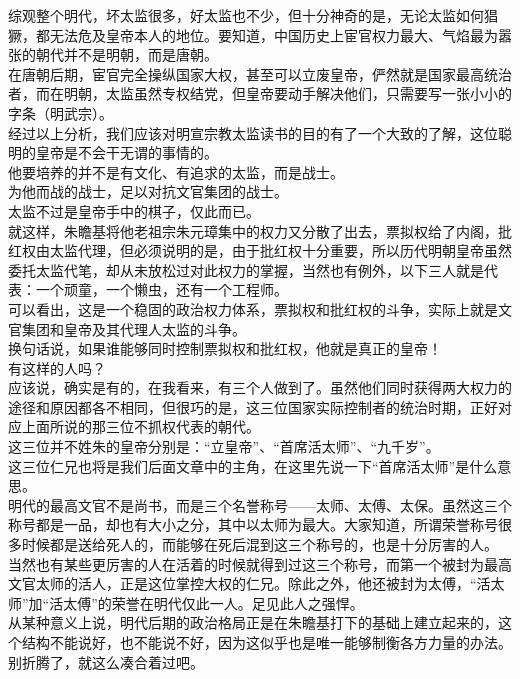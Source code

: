 \begin{multicols}{\theparacolNo}
综观整个明代，坏太监很多，好太监也不少，但十分神奇的是，无论太监如何猖獗，都无法危及皇帝本人的地位。要知道，中国历史上宦官权力最大、气焰最为嚣张的朝代并不是明朝，而是唐朝。\\

在唐朝后期，宦官完全操纵国家大权，甚至可以立废皇帝，俨然就是国家最高统治者，而在明朝，太监虽然专权结党，但皇帝要动手解决他们，只需要写一张小小的字条（明武宗）。\\

经过以上分析，我们应该对明宣宗教太监读书的目的有了一个大致的了解，这位聪明的皇帝是不会干无谓的事情的。\\

他要培养的并不是有文化、有追求的太监，而是战士。\\

为他而战的战士，足以对抗文官集团的战士。\\

太监不过是皇帝手中的棋子，仅此而已。\\

就这样，朱瞻基将他老祖宗朱元璋集中的权力又分散了出去，票拟权给了内阁，批红权由太监代理，但必须说明的是，由于批红权十分重要，所以历代明朝皇帝虽然委托太监代笔，却从未放松过对此权力的掌握，当然也有例外，以下三人就是代表：一个顽童，一个懒虫，还有一个工程师。\\

可以看出，这是一个稳固的政治权力体系，票拟权和批红权的斗争，实际上就是文官集团和皇帝及其代理人太监的斗争。\\

换句话说，如果谁能够同时控制票拟权和批红权，他就是真正的皇帝！\\

有这样的人吗？\\

应该说，确实是有的，在我看来，有三个人做到了。虽然他们同时获得两大权力的途径和原因都各不相同，但很巧的是，这三位国家实际控制者的统治时期，正好对应上面所说的那三位不抓权代表的朝代。\\

这三位并不姓朱的皇帝分别是：“立皇帝”、“首席活太师”、“九千岁”。\\

这三位仁兄也将是我们后面文章中的主角，在这里先说一下“首席活太师”是什么意思。\\

明代的最高文官不是尚书，而是三个名誉称号——太师、太傅、太保。虽然这三个称号都是一品，却也有大小之分，其中以太师为最大。大家知道，所谓荣誉称号很多时候都是送给死人的，而能够在死后混到这三个称号的，也是十分厉害的人。\\

当然也有某些更厉害的人在活着的时候就得到过这三个称号，而第一个被封为最高文官太师的活人，正是这位掌控大权的仁兄。除此之外，他还被封为太傅，“活太师”加“活太傅”的荣誉在明代仅此一人。足见此人之强悍。\\

从某种意义上说，明代后期的政治格局正是在朱瞻基打下的基础上建立起来的，这个结构不能说好，也不能说不好，因为这似乎也是唯一能够制衡各方力量的办法。\\

别折腾了，就这么凑合着过吧。\\
\ifnum{}
	\end{multicols}
